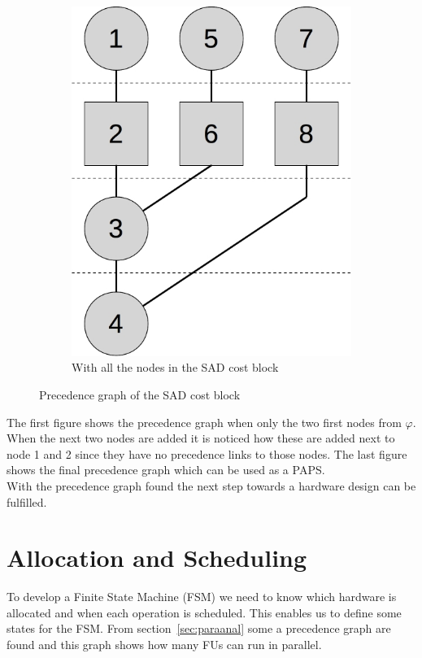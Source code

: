 \begin{figure}[ht]
\begin{subfigure}[t]{0.4\textwidth}
    \centering\includegraphics[scale=0.25]{figures/c_sadpre}
    \caption{With all the nodes in the SAD cost block\label{fig:prece3}}
  \end{subfigure}
  \caption{Precedence graph of the SAD cost block\label{fig:preceall}}
\end{figure}
The first figure shows the precedence graph when only the two first nodes from $\varphi$. When the next two nodes are added it is noticed how these are added next to node 1 and 2 since they have no precedence links to those nodes. The last figure shows the final precedence graph which can be used as a PAPS.\\

With the precedence graph found the next step towards a hardware design can be fulfilled. 

\section{Allocation and Scheduling}\label{sec:allocsched}
To develop a Finite State Machine (FSM) we need to know which hardware is allocated and when each operation is scheduled. This enables us to define some states for the FSM. From section~\ref{sec:paraanal} some a precedence graph are found and this graph shows how many FUs can run in parallel. \\

